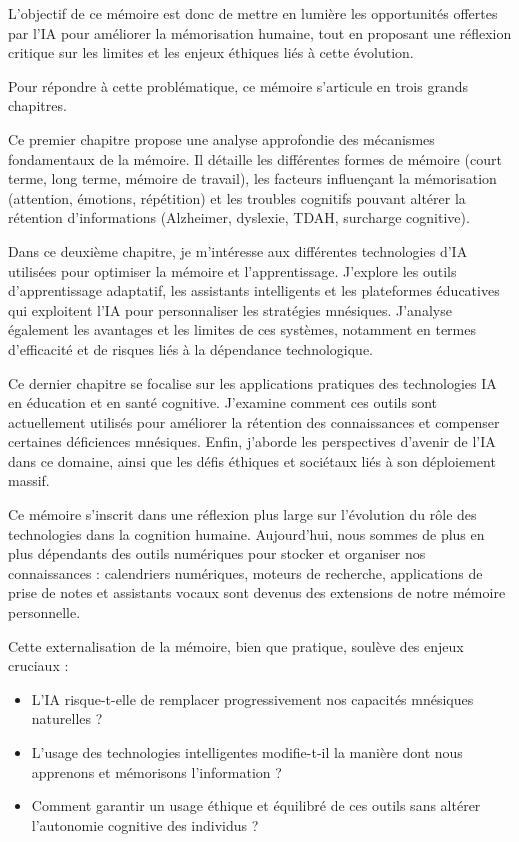 \documentclass[11pt,a4paper]{report}
\begin{document}
L’objectif de ce mémoire est donc de mettre en lumière les opportunités offertes par l’IA pour améliorer la mémorisation humaine, tout en proposant une réflexion critique sur les limites et les enjeux éthiques liés à cette évolution.

Pour répondre à cette problématique, ce mémoire s’articule en trois grands chapitres.

Ce premier chapitre propose une analyse approfondie des mécanismes fondamentaux de la mémoire. Il détaille les différentes formes de mémoire (court terme, long terme, mémoire de travail), les facteurs influençant la mémorisation (attention, émotions, répétition) et les troubles cognitifs pouvant altérer la rétention d’informations (Alzheimer, dyslexie, TDAH, surcharge cognitive).

Dans ce deuxième chapitre, je m'intéresse aux différentes technologies d’IA utilisées pour optimiser la mémoire et l’apprentissage. J'explore les outils d’apprentissage adaptatif, les assistants intelligents et les plateformes éducatives qui exploitent l’IA pour personnaliser les stratégies mnésiques. J'analyse également les avantages et les limites de ces systèmes, notamment en termes d’efficacité et de risques liés à la dépendance technologique.

Ce dernier chapitre se focalise sur les applications pratiques des technologies IA en éducation et en santé cognitive. J'examine comment ces outils sont actuellement utilisés pour améliorer la rétention des connaissances et compenser certaines déficiences mnésiques. Enfin, j'aborde les perspectives d’avenir de l’IA dans ce domaine, ainsi que les défis éthiques et sociétaux liés à son déploiement massif.

Ce mémoire s’inscrit dans une réflexion plus large sur l’évolution du rôle des technologies dans la cognition humaine. Aujourd’hui, nous sommes de plus en plus dépendants des outils numériques pour stocker et organiser nos connaissances : calendriers numériques, moteurs de recherche, applications de prise de notes et assistants vocaux sont devenus des extensions de notre mémoire personnelle.

Cette externalisation de la mémoire, bien que pratique, soulève des enjeux cruciaux :
\begin{itemize}

    \item L’IA risque-t-elle de remplacer progressivement nos capacités mnésiques naturelles ?
    
    \item L’usage des technologies intelligentes modifie-t-il la manière dont nous apprenons et mémorisons l’information ?

    \item Comment garantir un usage éthique et équilibré de ces outils sans altérer l’autonomie cognitive des individus ?

\end{itemize}
\end{document}
